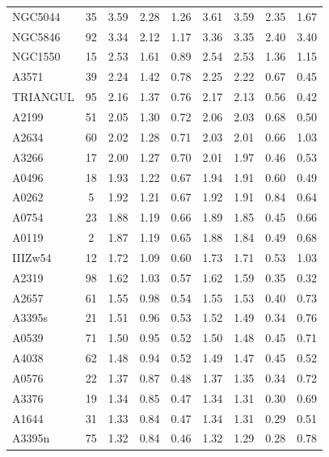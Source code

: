 \documentclass[10pt,aps,pra,reprint,amsmath,amsfonts,amssymb,showpacs,nofootinbib,floatfix]{revtex4-1}
\begin{document}
\begin{table}
\begin{minipage}{2.0\columnwidth}
\begin{tabular}{l  c c c c c c c c}
NGC5044  &  35 &   3.59 &   2.28 &   1.26 &   3.61 &   3.59 &   2.35 &   1.67 \\
NGC5846  &  92 &   3.34 &   2.12 &   1.17 &   3.36 &   3.35 &   2.40 &   3.40 \\
NGC1550  &  15 &   2.53 &   1.61 &   0.89 &   2.54 &   2.53 &   1.36 &   1.15 \\
A3571    &  39 &   2.24 &   1.42 &   0.78 &   2.25 &   2.22 &   0.67 &   0.45 \\
TRIANGUL &  95 &   2.16 &   1.37 &   0.76 &   2.17 &   2.13 &   0.56 &   0.42 \\
A2199    &  51 &   2.05 &   1.30 &   0.72 &   2.06 &   2.03 &   0.68 &   0.50 \\
A2634    &  60 &   2.02 &   1.28 &   0.71 &   2.03 &   2.01 &   0.66 &   1.03 \\
A3266    &  17 &   2.00 &   1.27 &   0.70 &   2.01 &   1.97 &   0.46 &   0.53 \\
A0496    &  18 &   1.93 &   1.22 &   0.67 &   1.94 &   1.91 &   0.60 &   0.49 \\
A0262    &   5 &   1.92 &   1.21 &   0.67 &   1.92 &   1.91 &   0.84 &   0.64 \\
A0754    &  23 &   1.88 &   1.19 &   0.66 &   1.89 &   1.85 &   0.45 &   0.66 \\
A0119    &   2 &   1.87 &   1.19 &   0.65 &   1.88 &   1.84 &   0.49 &   0.68 \\
IIIZw54  &  12 &   1.72 &   1.09 &   0.60 &   1.73 &   1.71 &   0.53 &   1.03 \\
A2319    &  98 &   1.62 &   1.03 &   0.57 &   1.62 &   1.59 &   0.35 &   0.32 \\
A2657    &  61 &   1.55 &   0.98 &   0.54 &   1.55 &   1.53 &   0.40 &   0.73 \\
A3395s   &  21 &   1.51 &   0.96 &   0.53 &   1.52 &   1.49 &   0.34 &   0.76 \\
A0539    &  71 &   1.50 &   0.95 &   0.52 &   1.50 &   1.48 &   0.45 &   0.71 \\
A4038    &  62 &   1.48 &   0.94 &   0.52 &   1.49 &   1.47 &   0.45 &   0.52 \\
A0576    &  22 &   1.37 &   0.87 &   0.48 &   1.37 &   1.35 &   0.34 &   0.72 \\
A3376    &  19 &   1.34 &   0.85 &   0.47 &   1.34 &   1.31 &   0.30 &   0.69 \\
A1644    &  31 &   1.33 &   0.84 &   0.47 &   1.34 &   1.31 &   0.29 &   0.51 \\
A3395n   &  75 &   1.32 &   0.84 &   0.46 &   1.32 &   1.29 &   0.28 &   0.78 \\

\end{tabular}
\end{minipage}
\end{table}
\end{document}
